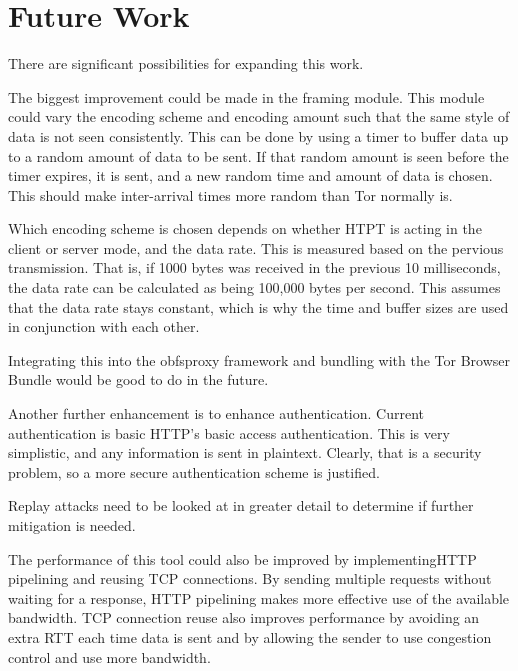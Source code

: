 \section{Future Work}

There are significant possibilities for expanding this work. 

The biggest improvement could be made in the framing module.  This module could vary the encoding scheme and encoding amount such that the same style of data is not seen consistently. This can be done by using a timer to buffer data up to a random amount of data to be sent. If that random amount is seen before the timer expires, it is sent, and a new random time and amount of data is chosen. This should make inter-arrival times more random than Tor normally is. 

Which encoding scheme is chosen depends on whether HTPT is acting in the client or server mode, and the data rate. This is measured based on the pervious transmission. That is, if 1000 bytes was received in the previous 10 milliseconds, the data rate can be calculated as being 100,000 bytes per second. This assumes that the data rate stays constant, which is why the time and buffer sizes are used in conjunction with each other.

Integrating this into the obfsproxy framework and bundling with the Tor Browser Bundle would be good to do in the future.

Another further enhancement is to enhance authentication. Current authentication is basic HTTP's basic access authentication. This is very simplistic, and any information is sent in plaintext. Clearly, that is a security problem, so a more secure authentication scheme is justified.

Replay attacks need to be looked at in greater detail to determine if further mitigation is needed.

The performance of this tool could also be improved by implementingHTTP pipelining and reusing TCP connections. By sending multiple requests without waiting for a response, HTTP pipelining makes more effective use of the available bandwidth. TCP connection reuse also improves performance by avoiding an extra RTT each time data is sent and by allowing the sender to use congestion control and use more bandwidth.

